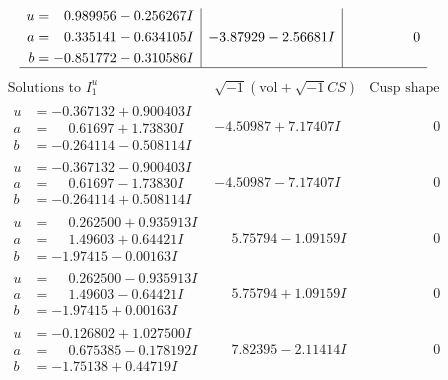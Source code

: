 \documentclass[1p]{elsarticle_modified}
\theoremstyle{definition}
\newcommand{\I}{\sqrt{-1}}
\begin{document}
$$\begin{array}{c|c|c}
\begin{aligned}
u &= \phantom{-}0.989956 - 0.256267 I \\
a &= \phantom{-}0.335141 - 0.634105 I \\
b &= -0.851772 - 0.310586 I\end{aligned}
 & -3.87929 - 2.56681 I & \phantom{-0.000000 } 0\\
 \hline 
 \end{array}$$\newpage$$\begin{array}{c|c|c}  
\text{Solutions to }I^u_{1}& \I (\text{vol} + \sqrt{-1}CS) & \text{Cusp shape}\\
 \hline 
\begin{aligned}
u &= -0.367132 + 0.900403 I \\
a &= \phantom{-}0.61697 + 1.73830 I \\
b &= -0.264114 - 0.508114 I\end{aligned}
 & -4.50987 + 7.17407 I & \phantom{-0.000000 } 0 \\ \hline\begin{aligned}
u &= -0.367132 - 0.900403 I \\
a &= \phantom{-}0.61697 - 1.73830 I \\
b &= -0.264114 + 0.508114 I\end{aligned}
 & -4.50987 - 7.17407 I & \phantom{-0.000000 } 0 \\ \hline\begin{aligned}
u &= \phantom{-}0.262500 + 0.935913 I \\
a &= \phantom{-}1.49603 + 0.64421 I \\
b &= -1.97415 - 0.00163 I\end{aligned}
 & \phantom{-}5.75794 - 1.09159 I & \phantom{-0.000000 } 0 \\ \hline\begin{aligned}
u &= \phantom{-}0.262500 - 0.935913 I \\
a &= \phantom{-}1.49603 - 0.64421 I \\
b &= -1.97415 + 0.00163 I\end{aligned}
 & \phantom{-}5.75794 + 1.09159 I & \phantom{-0.000000 } 0 \\ \hline\begin{aligned}
u &= -0.126802 + 1.027500 I \\
a &= \phantom{-}0.675385 - 0.178192 I \\
b &= -1.75138 + 0.44719 I\end{aligned}
 & \phantom{-}7.82395 - 2.11414 I & \phantom{-0.000000 } 0 \\ \hline\begin{aligned}

\end{aligned}
\end{array}$$
\end{document}
